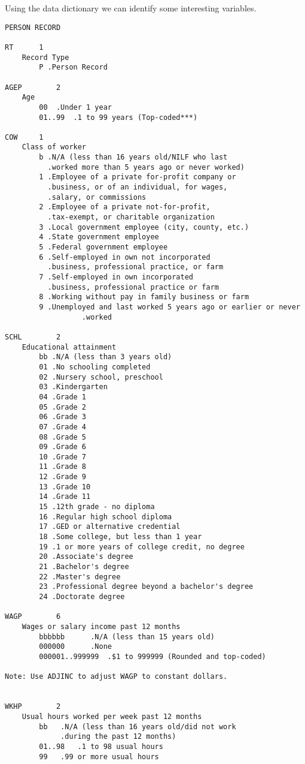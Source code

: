 \documentclass[]{book}
\theoremstyle{definition}
\theoremstyle{definition}
\theoremstyle{remark}
\begin{document}
Using the data dictionary we can identify some interesting variables.

\begin{verbatim}
PERSON RECORD

RT      1   
    Record Type     
        P .Person Record

AGEP        2   
    Age
        00  .Under 1 year   
        01..99  .1 to 99 years (Top-coded***)

COW     1   
    Class of worker
        b .N/A (less than 16 years old/NILF who last
          .worked more than 5 years ago or never worked)
        1 .Employee of a private for-profit company or
          .business, or of an individual, for wages,
          .salary, or commissions
        2 .Employee of a private not-for-profit,
          .tax-exempt, or charitable organization
        3 .Local government employee (city, county, etc.)
        4 .State government employee
        5 .Federal government employee
        6 .Self-employed in own not incorporated
          .business, professional practice, or farm
        7 .Self-employed in own incorporated
          .business, professional practice or farm
        8 .Working without pay in family business or farm
        9 .Unemployed and last worked 5 years ago or earlier or never
                  .worked
        
SCHL        2   
    Educational attainment
        bb .N/A (less than 3 years old)
        01 .No schooling completed
        02 .Nursery school, preschool   
        03 .Kindergarten
        04 .Grade 1
        05 .Grade 2
        06 .Grade 3     
        07 .Grade 4
        08 .Grade 5
        09 .Grade 6
        10 .Grade 7     
        11 .Grade 8  
        12 .Grade 9
        13 .Grade 10
        14 .Grade 11        
        15 .12th grade - no diploma   
        16 .Regular high school diploma
        17 .GED or alternative credential
        18 .Some college, but less than 1 year
        19 .1 or more years of college credit, no degree
        20 .Associate's degree      
        21 .Bachelor's degree
        22 .Master's degree
        23 .Professional degree beyond a bachelor's degree
        24 .Doctorate degree
        
WAGP        6   
    Wages or salary income past 12 months
        bbbbbb      .N/A (less than 15 years old)
        000000      .None
        000001..999999  .$1 to 999999 (Rounded and top-coded)

Note: Use ADJINC to adjust WAGP to constant dollars.


WKHP        2   
    Usual hours worked per week past 12 months
        bb   .N/A (less than 16 years old/did not work 
             .during the past 12 months)
        01..98   .1 to 98 usual hours
        99   .99 or more usual hours
        

\end{verbatim}
\end{document}
